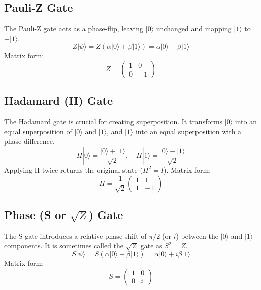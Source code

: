 \subsection*{Pauli-Z Gate}
The Pauli-Z gate acts as a phase-flip, leaving $|0\rangle$ unchanged and mapping $|1\rangle$ to $-|1\rangle$.
\begin{equation*}
    Z|\psi\rangle = Z(\alpha|0\rangle + \beta|1\rangle) = \alpha|0\rangle - \beta|1\rangle
\end{equation*}
Matrix form:
\begin{equation*}
    Z = \begin{pmatrix} 1 & 0 \\ 0 & -1 \end{pmatrix}
\end{equation*}

\subsection*{Hadamard (H) Gate}
The Hadamard gate is crucial for creating superposition. It transforms $|0\rangle$ into an equal superposition of $|0\rangle$ and $|1\rangle$, and $|1\rangle$ into an equal superposition with a phase difference.
\begin{equation*}
    H|0\rangle = \frac{|0\rangle + |1\rangle}{\sqrt{2}}, \quad H|1\rangle = \frac{|0\rangle - |1\rangle}{\sqrt{2}}
\end{equation*}
Applying H twice returns the original state ($H^2 = I$).
Matrix form:
\begin{equation*}
    H = \frac{1}{\sqrt{2}}\begin{pmatrix} 1 & 1 \\ 1 & -1 \end{pmatrix}
\end{equation*}

\subsection*{Phase (S or $\sqrt{Z}$) Gate}
The S gate introduces a relative phase shift of $\pi/2$ (or $i$) between the $|0\rangle$ and $|1\rangle$ components. It is sometimes called the $\sqrt{Z}$ gate as $S^2 = Z$.
\begin{equation*}
    S|\psi\rangle = S(\alpha|0\rangle + \beta|1\rangle) = \alpha|0\rangle + i\beta|1\rangle
\end{equation*}
Matrix form:
\begin{equation*}
    S = \begin{pmatrix} 1 & 0 \\ 0 & i \end{pmatrix}
\end{equation*}

